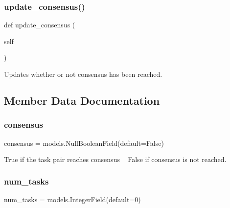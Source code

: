 \subsubsection{\texorpdfstring{update\_consensus()}{update\_consensus()}}
{\footnotesize\ttfamily def update\+\_\+consensus (\begin{DoxyParamCaption}\item[{}]{self }\end{DoxyParamCaption})}



Updates whether or not consensus has been reached. 



\subsection{Member Data Documentation}
\mbox{\label{classjoinapp_1_1models_1_1task__management__models_1_1_find_pairs_task_acd4d1b3226891bb64f1fb71cff3a390e}} 
\subsubsection{\texorpdfstring{consensus}{consensus}}
{\footnotesize\ttfamily consensus = models.\+Null\+Boolean\+Field(default=False)\hspace{0.3cm}{\ttfamily [static]}}



True if the task pair reaches consensus ~\newline
 False if consensus is not reached. 

\mbox{\label{classjoinapp_1_1models_1_1task__management__models_1_1_find_pairs_task_afc259a6f918180e978f96108b03d3411}} 
\subsubsection{\texorpdfstring{num\_tasks}{num\_tasks}}
{\footnotesize\ttfamily num\+\_\+tasks = models.\+Integer\+Field(default=0)\hspace{0.3cm}{\ttfamily [static]}}



